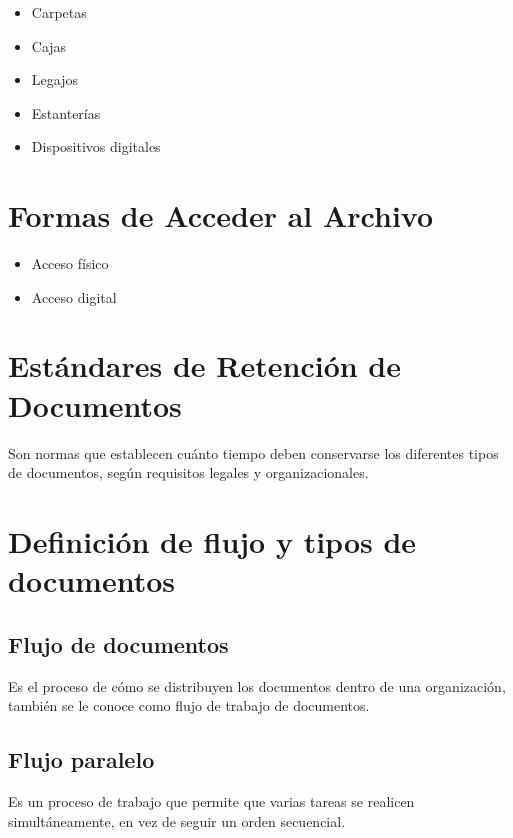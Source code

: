 \documentclass{article}
\begin{document}
\begin{itemize}
    \item   Carpetas
    \item   Cajas
    \item   Legajos
    \item   Estanterías
    \item   Dispositivos digitales
\end{itemize}

\hrulefill

\section{Formas de Acceder al Archivo}

\begin{itemize}
    \item   Acceso físico
    \item   Acceso digital
\end{itemize}

\hrulefill

\section{Estándares de Retención de Documentos}

Son normas que establecen cuánto tiempo deben conservarse los diferentes tipos de documentos, según requisitos legales y organizacionales.


\hrulefill

\section{Definición de flujo y tipos de documentos}

\subsection{Flujo de documentos}

Es el proceso de cómo se distribuyen los documentos dentro de una organización, también se le conoce como flujo de trabajo de documentos.

\subsection{Flujo paralelo}

Es un proceso de trabajo que permite que varias tareas se realicen simultáneamente, en vez de seguir un orden secuencial.
\end{document}

